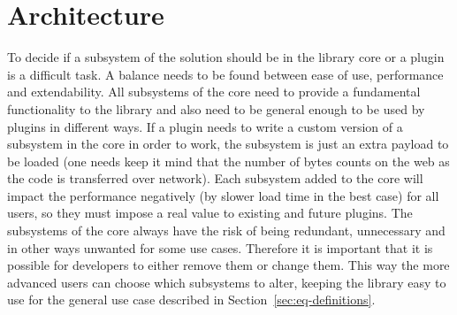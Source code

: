 \documentclass[a4paper,11pt]{kth-mag}
\begin{document}
    \section{Architecture}\label{sec:arcithecture}
      To decide if a subsystem of the solution should be in the library core or a plugin is a difficult task.
      A balance needs to be found between ease of use, performance and extendability.
      All subsystems of the core need to provide a fundamental functionality to the library and also need to be general enough to be used by plugins in different ways.
      If a plugin needs to write a custom version of a subsystem in the core in order to work, the subsystem is just an extra payload to be loaded (one needs keep it mind that the number of bytes counts on the \gls{web} as the code is transferred over network).
      Each subsystem added to the core will impact the performance negatively (by slower load time in the best case) for all users, so they must impose a real value to existing and future plugins.
      The subsystems of the core always have the risk of being redundant, unnecessary and in other ways unwanted for some use cases.
      Therefore it is important that it is possible for developers to either remove them or change them.
      This way the more advanced users can choose which subsystems to alter, keeping the library easy to use for the general use case described in Section~\ref{sec:eq-definitions}.

      
\end{document}
